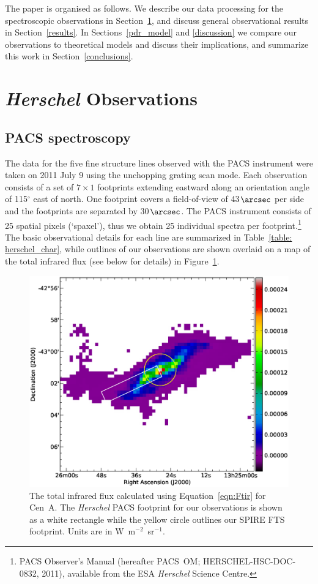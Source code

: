 \documentclass[preprint2]{aastex}
\begin{document}
The paper is organised as follows.  We describe our data processing for the spectroscopic observations in Section~\ref{Herschel_obs}, and discuss general observational results in Section~\ref{results}. In Sections~\ref{pdr_model} and \ref{discussion} we compare our observations to theoretical models and discuss their implications, and summarize this work in Section~\ref{conclusions}.

\section{\emph{Herschel} Observations}\label{Herschel_obs}

\subsection{PACS spectroscopy}\label{pacs_spec}
The data for the five fine structure lines observed with the PACS instrument were taken on 2011 July 9 using the unchopping grating scan mode.  Each observation consists of a set of $7 \times 1$ footprints extending eastward along an orientation angle of 115$^{\circ}$ east of north.  One footprint covers a field-of-view of 43$\arcsec$ per side and the footprints are separated by 30$\arcsec$.  The PACS instrument consists of 25 spatial pixels (`spaxel'), thus we obtain 25 individual spectra per footprint.\footnote{PACS Observer's Manual (hereafter PACS~OM; HERSCHEL-HSC-DOC-0832, 2011), available from the ESA \emph{Herschel} Science Centre.}
The basic observational details for each line are summarized in Table~\ref{table: herschel_char}, while outlines of our observations are shown overlaid on a map of the total infrared flux (see below for details) in Figure~\ref{fig:F_tir}.

\begin{figure}
\includegraphics[width=\columnwidth]{CenA_Ftir_image_v1}
\caption{The total infrared flux calculated using Equation~\ref{eqn:Ftir} for Cen~A.  The \emph{Herschel} PACS footprint for our observations is shown as a white rectangle while the yellow circle outlines our SPIRE FTS footprint.  Units are in W~m$^{-2}$~sr$^{-1}$.}
\label{fig:F_tir}
\end{figure}
\end{document}
